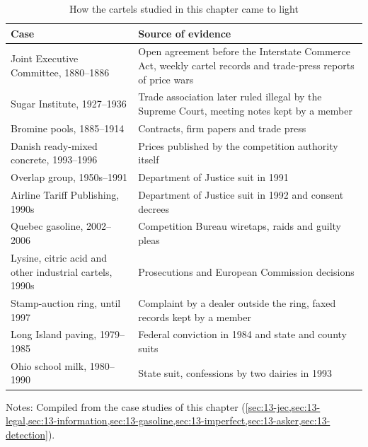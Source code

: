 \begin{table}[htbp]
\centering
\caption{How the cartels studied in this chapter came to light}\label{tab:13-discovery}
\footnotesize
\begin{tabularx}{\textwidth}{@{}>{\raggedright\arraybackslash}p{4.1cm}>{\raggedright\arraybackslash}X@{}}
\toprule
Case & Source of evidence\\
\midrule
Joint Executive Committee, 1880--1886 & Open agreement before the Interstate Commerce Act, weekly cartel records and
trade-press reports of price wars\\
Sugar Institute, 1927--1936 & Trade association later ruled illegal by the Supreme Court, meeting notes kept by a
member\\
Bromine pools, 1885--1914 & Contracts, firm papers and trade press\\
Danish ready-mixed concrete, 1993--1996 & Prices published by the competition authority itself\\
Overlap group, 1950s--1991 & Department of Justice suit in 1991\\
Airline Tariff Publishing, 1990s & Department of Justice suit in 1992 and consent decrees\\
Quebec gasoline, 2002--2006 & Competition Bureau wiretaps, raids and guilty pleas\\
Lysine, citric acid and other industrial cartels, 1990s & Prosecutions and European Commission decisions\\
Stamp-auction ring, until 1997 & Complaint by a dealer outside the ring, faxed records kept by a member\\
Long Island paving, 1979--1985 & Federal conviction in 1984 and state and county suits\\
Ohio school milk, 1980--1990 & State suit, confessions by two dairies in 1993\\
\bottomrule
\end{tabularx}

\smallskip
\begin{minipage}{0.95\textwidth}\footnotesize
Notes: Compiled from the case studies of this chapter
(\cref{sec:13-jec,sec:13-legal,sec:13-information,sec:13-gasoline,sec:13-imperfect,sec:13-asker,sec:13-detection}).
\end{minipage}
\end{table}


